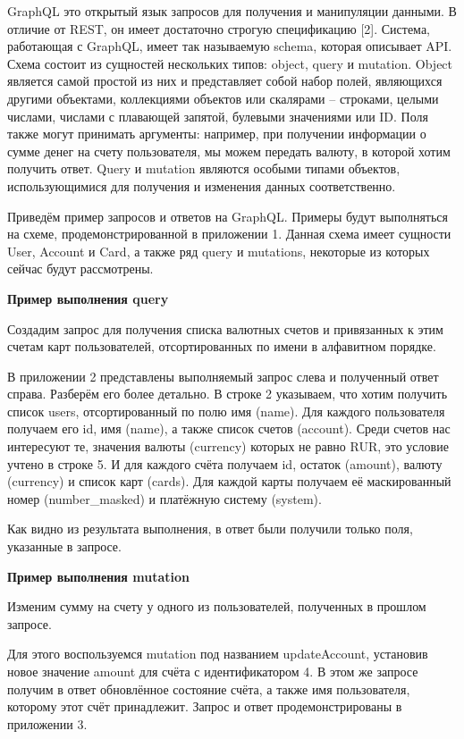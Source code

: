 GraphQL это открытый язык запросов для получения и манипуляции данными.
В отличие от REST, он имеет достаточно строгую спецификацию [2].
Система, работающая с GraphQL, имеет так называемую schema, которая описывает API. Схема состоит из сущностей нескольких типов: object, query и mutation.
Object является самой простой из них и представляет собой набор полей, являющихся другими объектами, коллекциями объектов или скалярами – строками, целыми числами, числами с плавающей запятой, булевыми значениями или ID. Поля также могут принимать аргументы: например, при получении информации о сумме денег на счету пользователя, мы можем передать валюту, в которой хотим получить ответ.
Query и mutation являются особыми типами объектов, использующимися для получения и изменения данных соответственно.

Приведём пример запросов и ответов на GraphQL. Примеры будут выполняться на схеме, продемонстрированной в приложении 1.
Данная схема имеет сущности User, Account и Card, а также ряд query и mutations, некоторые из которых сейчас будут рассмотрены.

\textbf{Пример выполнения query}

Создадим запрос для получения списка валютных счетов и привязанных к этим счетам карт пользователей, отсортированных по имени в алфавитном порядке.

В приложении 2 представлены выполняемый запрос слева и полученный ответ справа.
Разберём его более детально.
В строке 2 указываем, что хотим получить список users, отсортированный по полю имя (name).
Для каждого пользователя получаем его id, имя (name), а также список счетов (account).
Среди счетов нас интересуют те, значения валюты (currency) которых не равно RUR, это условие учтено в строке 5.
И для каждого счёта получаем id, остаток (amount), валюту (currency) и список карт (cards).
Для каждой карты получаем её маскированный номер (number\_masked) и платёжную систему (system).

Как видно из результата выполнения, в ответ были получили только поля, указанные в запросе.

\textbf{Пример выполнения mutation}

Изменим сумму на счету у одного из пользователей, полученных в прошлом запросе.

Для этого воспользуемся mutation под названием updateAccount, установив новое значение amount для счёта с идентификатором 4.
В этом же запросе получим в ответ обновлённое состояние счёта, а также имя пользователя, которому этот счёт принадлежит.
Запрос и ответ продемонстрированы в приложении 3.


